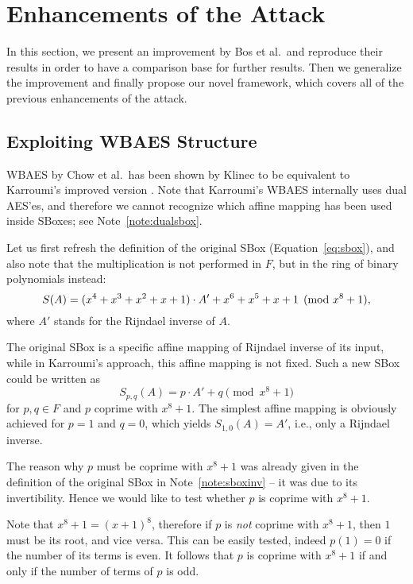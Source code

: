 \section{Enhancements of the Attack}
\label{sec:enhancements}

In this section, we present an improvement by Bos et al.\ and reproduce their results in order to have a comparison base for further results. Then we generalize the improvement and finally propose our novel framework, which covers all of the previous enhancements of the attack.



\subsection{Exploiting WBAES Structure}

WBAES by Chow et al.\ has been shown by Klinec \cite{klinec2013white} to be equivalent to Karroumi's improved version \cite{karroumi2010protecting}. Note that Karroumi's WBAES internally uses dual AES'es, and therefore we cannot recognize which affine mapping has been used inside SBoxes; see Note~\ref{note:dualsbox}.

Let us first refresh the definition of the original SBox (Equation~\ref{eq:sbox}), and also note that the multiplication is not performed in $F$, but in the ring of binary polynomials instead:
\[
	S(A) = (x^4 + x^3 + x^2 + x + 1) \cdot A' + x^6 + x^5 + x + 1 \pmod{x^8+1} ,
\]
where $A'$ stands for the Rijndael inverse of $A$.

The original SBox is a specific affine mapping of Rijndael inverse of its input, while in Karroumi's approach, this affine mapping is not fixed. Such a new SBox could be written as
\begin{equation}
\label{eq:spq}
	S_{p,q}(A) = p\cdot A' + q \pmod{x^8+1}
\end{equation}
for $p,q\in F$ and $p$ coprime with $x^8+1$. The simplest affine mapping is obviously achieved for $p=1$ and $q=0$, which yields $S_{1,0}(A) = A'$, i.e., only a Rijndael inverse.

\begin{remark}
\label{rem:coprime}
	The reason why $p$ must be coprime with $x^8+1$ was already given in the definition of the original SBox in Note~\ref{note:sboxinv} -- it was due to its invertibility. Hence we would like to test whether $p$ is coprime with $x^8+1$.
	
	Note that $x^8+1 = (x+1)^8$, therefore if $p$ is {\em not} coprime with $x^8+1$, then $1$ must be its root, and vice versa. This can be easily tested, indeed $p(1) = 0$ if the number of its terms is even. It follows that $p$ is coprime with $x^8+1$ if and only if the number of terms of $p$ is odd.
\end{remark}


